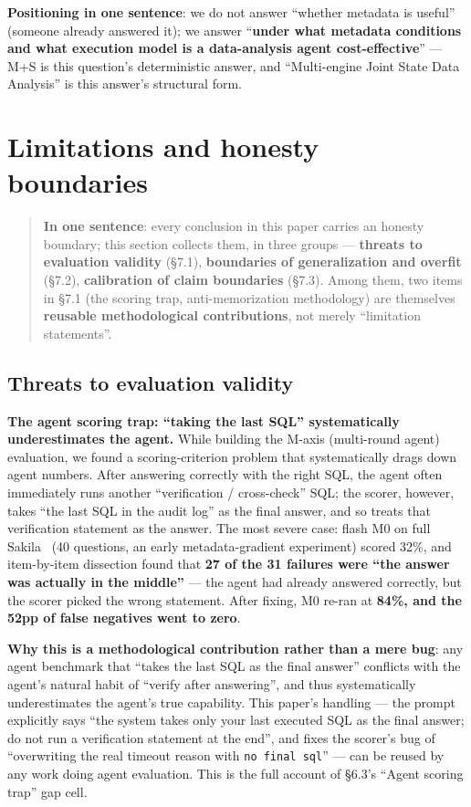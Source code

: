 \documentclass[11pt]{article}
\begin{document}
\textbf{Positioning in one sentence}: we do not answer ``whether metadata is useful'' (someone already answered it); we answer ``\textbf{under what metadata conditions and what execution model is a data-analysis agent cost-effective}'' --- M+S is this question's deterministic answer, and ``Multi-engine Joint State Data Analysis'' is this answer's structural form.

\section{Limitations and honesty boundaries}

\begin{quote}
\textbf{In one sentence}: every conclusion in this paper carries an honesty boundary; this section collects them, in three groups --- \textbf{threats to evaluation validity} (\S{}7.1), \textbf{boundaries of generalization and overfit} (\S{}7.2), \textbf{calibration of claim boundaries} (\S{}7.3). Among them, two items in \S{}7.1 (the scoring trap, anti-memorization methodology) are themselves \textbf{reusable methodological contributions}, not merely ``limitation statements''.
\end{quote}

\subsection{Threats to evaluation validity}

\textbf{ The agent scoring trap: ``taking the last SQL'' systematically underestimates the agent.} While building the M-axis (multi-round agent) evaluation, we found a scoring-criterion problem that systematically drags down agent numbers. After answering correctly with the right SQL, the agent often immediately runs another ``verification / cross-check'' SQL; the scorer, however, takes ``the last SQL in the audit log'' as the final answer, and so treats that verification statement as the answer. The most severe case: flash M0 on full Sakila~\cite{sakila} (40 questions, an early metadata-gradient experiment) scored 32\%, and item-by-item dissection found that \textbf{27 of the 31 failures were ``the answer was actually in the middle''} --- the agent had already answered correctly, but the scorer picked the wrong statement. After fixing, M0 re-ran at \textbf{84\%, and the 52pp of false negatives went to zero}.

\textbf{Why this is a methodological contribution rather than a mere bug}: any agent benchmark that ``takes the last SQL as the final answer'' conflicts with the agent's natural habit of ``verify after answering'', and thus systematically underestimates the agent's true capability. This paper's handling --- the prompt explicitly says ``the system takes only your last executed SQL as the final answer; do not run a verification statement at the end'', and fixes the scorer's bug of ``overwriting the real timeout reason with \texttt{no\ final\ sql}'' --- can be reused by any work doing agent evaluation. This is the full account of \S{}6.3's ``Agent scoring trap'' gap cell.
\end{document}
